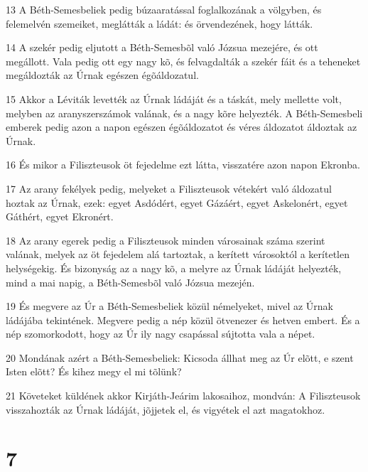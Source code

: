 \par 13 A Béth-Semesbeliek pedig búzaaratással foglalkozának a völgyben, és felemelvén szemeiket, meglátták a ládát: és örvendezének, hogy látták.
\par 14 A szekér pedig eljutott a Béth-Semesbõl való Józsua mezejére, és ott megállott. Vala pedig ott egy nagy kõ, és felvagdalták a szekér fáit és a teheneket megáldozták az Úrnak egészen égõáldozatul.
\par 15 Akkor a Léviták levették az Úrnak ládáját és a táskát, mely mellette volt, melyben az aranyszerszámok valának, és a nagy kõre helyezték. A Béth-Semesbeli emberek pedig azon a napon egészen égõáldozatot és véres áldozatot áldoztak az Úrnak.
\par 16 És mikor a Filiszteusok öt fejedelme ezt látta, visszatére azon napon Ekronba.
\par 17 Az arany fekélyek pedig, melyeket a Filiszteusok vétekért való áldozatul hoztak az Úrnak, ezek: egyet Asdódért, egyet Gázáért, egyet Askelonért, egyet Gáthért, egyet Ekronért.
\par 18 Az arany egerek pedig a Filiszteusok minden városainak száma szerint valának, melyek az öt fejedelem alá tartoztak, a kerített városoktól a kerítetlen helységekig. És bizonyság az a nagy kõ, a melyre az Úrnak ládáját helyezték, mind a mai napig, a Béth-Semesbõl való Józsua mezején.
\par 19 És megvere az Úr a Béth-Semesbeliek közül némelyeket, mivel az Úrnak ládájába tekintének. Megvere pedig a nép közül ötvenezer és hetven embert. És a nép szomorkodott, hogy az Úr ily nagy csapással sújtotta vala a népet.
\par 20 Mondának azért a Béth-Semesbeliek: Kicsoda állhat meg az Úr elõtt, e szent Isten elõtt? És kihez megy el mi tõlünk?
\par 21 Követeket küldének akkor Kirjáth-Jeárim lakosaihoz, mondván: A Filiszteusok visszahozták az Úrnak ládáját, jõjjetek el, és vigyétek el azt magatokhoz.

\chapter{7}

